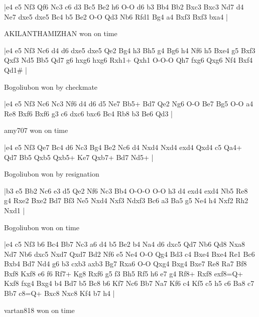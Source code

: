 \makegametitle
|e4 e5 Nf3 Qf6 Nc3 c6 d3 Bc5 Be2 h6 O-O d6 b3 Bb4 Bb2 Bxc3 Bxc3 Nd7 d4 Ne7 dxe5 dxe5 Bc4 b5 Be2 O-O Qd3 Nb6 Rfd1 Bg4 a4 Bxf3 Bxf3 bxa4  |

\showboard

AKILANTHAMIZHAN won on time

\makegametitle
|e4 e5 Nf3 Nc6 d4 d6 dxe5 dxe5 Qe2 Bg4 h3 Bh5 g4 Bg6 h4 Nf6 h5 Bxe4 g5 Bxf3 Qxf3 Nd5 Bb5 Qd7 g6 hxg6 hxg6 Rxh1+ Qxh1 O-O-O Qh7 fxg6 Qxg6 Nf4 Bxf4 Qd1\#  |

\showboard

Bogoliubon won by checkmate

\makegametitle
|e4 e5 Nf3 Nc6 Nc3 Nf6 d4 d6 d5 Ne7 Bb5+ Bd7 Qe2 Ng6 O-O Be7 Bg5 O-O a4 Re8 Bxf6 Bxf6 g3 c6 dxc6 bxc6 Bc4 Rb8 b3 Be6 Qd3  |

\showboard

amy707 won on time

\makegametitle
|e4 e5 Nf3 Qe7 Bc4 d6 Nc3 Bg4 Be2 Nc6 d4 Nxd4 Nxd4 exd4 Qxd4 c5 Qa4+ Qd7 Bb5 Qxb5 Qxb5+ Ke7 Qxb7+ Bd7 Nd5+  |

\showboard

Bogoliubon won by resignation

\makegametitle
|b3 e5 Bb2 Nc6 e3 d5 Qe2 Nf6 Nc3 Bb4 O-O-O O-O h3 d4 exd4 exd4 Nb5 Re8 g4 Rxe2 Bxe2 Bd7 Bf3 Ne5 Nxd4 Nxf3 Ndxf3 Bc6 a3 Ba5 g5 Ne4 h4 Nxf2 Rh2 Nxd1  |

\showboard

Bogoliubon won on time

\makegametitle
|e4 c5 Nf3 b6 Bc4 Bb7 Nc3 a6 d4 b5 Be2 b4 Na4 d6 dxc5 Qd7 Nb6 Qd8 Nxa8 Nd7 Nb6 dxc5 Nxd7 Qxd7 Bd2 Nf6 e5 Ne4 O-O Qg4 Bd3 c4 Bxe4 Bxe4 Re1 Bc6 Bxb4 Bd7 Nd4 g6 b3 cxb3 axb3 Bg7 Rxa6 O-O Qxg4 Bxg4 Bxe7 Re8 Ra7 Bf8 Bxf8 Kxf8 e6 f6 Rf7+ Kg8 Rxf6 g5 f3 Bh5 Rf5 h6 e7 g4 Rf8+ Rxf8 exf8=Q+ Kxf8 fxg4 Bxg4 b4 Bd7 b5 Bc8 b6 Kf7 Nc6 Bb7 Na7 Kf6 c4 Kf5 c5 h5 c6 Ba8 c7 Bb7 c8=Q+ Bxc8 Nxc8 Kf4 b7 h4  |

\showboard

vartan818 won on time

